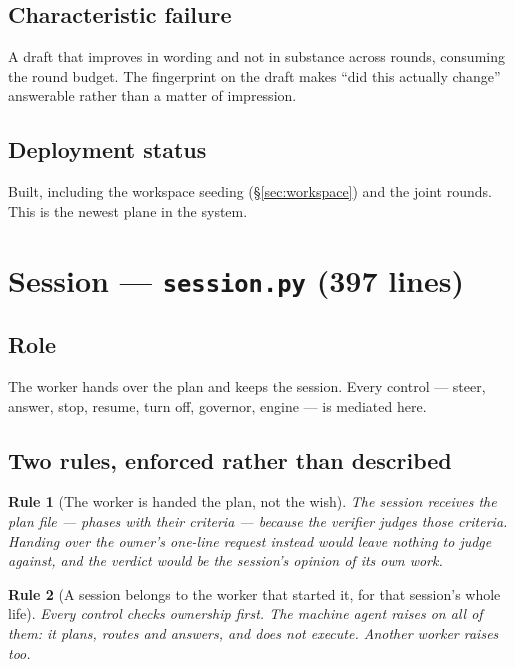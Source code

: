 \documentclass[11pt]{article}
\newtheorem{drule}{Rule}
\newcommand{\code}[1]{\texttt{\small #1}}
\begin{document}
\subsection{Characteristic failure}

A draft that improves in wording and not in substance across rounds, consuming the round budget. The fingerprint on the draft makes ``did this actually change'' answerable rather than a matter of impression.

\subsection{Deployment status}

Built, including the workspace seeding (\S\ref{sec:workspace}) and the joint rounds. This is the newest plane in the system.

\section{Session --- \code{session.py} (397 lines)}
\label{sec:session}

\subsection{Role}

The worker hands over the plan and keeps the session. Every control --- steer, answer, stop, resume, turn off, governor, engine --- is mediated here.

\subsection{Two rules, enforced rather than described}

\begin{drule}[The worker is handed the plan, not the wish]
\label{rule:planned}
The session receives the plan file --- phases with their criteria --- because the verifier judges those criteria. Handing over the owner's one-line request instead would leave nothing to judge against, and the verdict would be the session's opinion of its own work.
\end{drule}

\begin{drule}[A session belongs to the worker that started it, for that session's whole life]
\label{rule:ownership}
Every control checks ownership first. The machine agent raises on all of them: it plans, routes and answers, and does not execute. Another worker raises too.
\end{drule}
\end{document}
